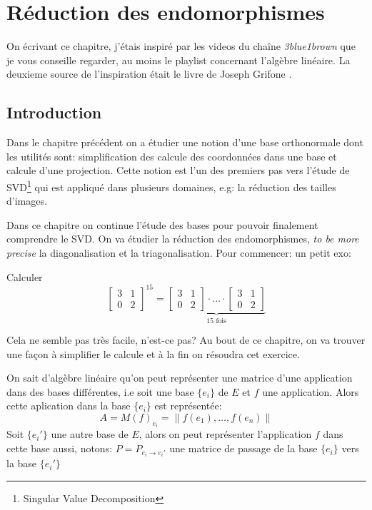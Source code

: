 \chapter{Réduction des endomorphismes}
On écrivant ce chapitre, j'étais inspiré par les videos du chaîne \textit{3blue1brown} que je vous conseille regarder, au moins le playlist concernant l'algèbre linéaire. La deuxieme source de l'inspiration était le livre de Joseph Grifone \cite{grifone}.
\section{Introduction}
Dans le chapitre précédent on a étudier une notion d'une base orthonormale dont les utilités sont: simplification des calcule des coordonnées dans une base et calcule d'une projection. 
Cette notion est l'un des premiers pas vers l'étude de SVD\footnote{Singular Value Decomposition} qui est appliqué dans plusieurs domaines, e.g: la réduction des tailles d'images.
\par
Dans ce chapitre on continue l'étude des bases pour pouvoir finalement comprendre le SVD. On va étudier la réduction des endomorphismes, \textit{to be more precise} la diagonalisation et la triagonalisation. Pour commencer: un petit exo:
\begin{ex}
   Calculer 
   \[
   \begin{bmatrix} 
       3 & 1\\
       0 & 2
   \end{bmatrix}^{15} = \underbrace{
       \begin{bmatrix} 
       3 & 1\\
       0 & 2
       \end{bmatrix}
       \cdot
       \ldots
       \cdot
       \begin{bmatrix} 
       3 & 1\\
       0 & 2
       \end{bmatrix}
   }_{15 \text{ fois}}
   \] 
\end{ex}
Cela ne semble pas très facile, n'est-ce pas? Au bout de ce chapitre, on va trouver une façon à simplifier le calcule et à la fin on résoudra cet exercice.
\par
On sait d'algèbre linéaire qu'on peut représenter une matrice d'une application dans des bases différentes, i.e soit une base $\{e_i\}$ de $E$ et  $f$ une application. Alors cette aplication dans la base  $\{e_i\}$ est représentée:
 \[
A = M(f)_{e_i} = \|f(e_1), \ldots, f(e_n)\|
\] 
Soit $\{e_i'\}$ une autre base de  $E$, alors on peut représenter l'application  $f$ dans cette base aussi, notons:  $P = P_{e_i \to e_i'}$ une matrice de passage de la base $\{e_i\}$ vers la base  $\{e_i'\}$
